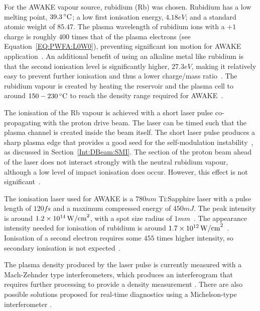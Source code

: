 For the AWAKE vapour source, rubidium (Rb) was chosen.
Rubidium has a low melting point, $39.3\celsius$; a low first ionisation energy, $4.18\unit{eV}$; and a standard atomic weight of $85.47$.
The plasma wavelength of rubidium ions with a $+1$ charge is roughly $400$ times that of the plasma electrons (see Equation~\ref{EQ:PWFA:L0W0}), preventing significant ion motion for AWAKE application~\cite{vieira:2012a}.
An additional benefit of using an alkaline metal like rubidium is that the second ionisation level is significantly higher, $27.3\unit{eV}$, making it relatively easy to prevent further ionisation and thus a lower charge/mass ratio~\cite{awake_collaboration:2017}.
The rubidium vapour is created by heating the reservoir and the plasma cell to around $150-230\celsius$ to reach the density range required for AWAKE~\cite{caldwell:2015,muggli:2017a}.

The ionisation of the Rb vapour is achieved with a short laser pulse co-propagating with the proton drive beam.
The laser can be timed such that the plasma channel is created inside the beam itself.
The short laser pulse produces a sharp plasma edge that provides a good seed for the self-modulation instability~\cite{vieira:2014a}, as discussed in Section~\ref{Int:DBeam:SMI}.
The section of the proton beam ahead of the laser does not interact strongly with the neutral rubidium vapour, although a low level of impact ionisation does occur.
However, this effect is not significant~\cite{awake_collaboration:2017}.

The ionisation laser used for AWAKE is a $780\unit{nm}$ Ti:Sapphire laser with a pulse length of $120\unit{fs}$ and a maximum compressed energy of $450\unit{mJ}$.
The peak intensity is around $1.2\nexp{14}\unit{W/cm}^{2}$, with a spot size radius of $1\unit{mm}$~\cite{awake_collaboration:2017}.
The appearance intensity needed for ionisation of rubidium is around $1.7\nexp{12}\unit{W/cm}^{2}$~\cite{augst:1989}.
Ionisation of a second electron requires some $455$ times higher intensity, so secondary ionisation is not expected~\cite{muggli:2017a}.

The plasma density produced by the laser pulse is currently measured with a Mach-Zehnder type interferometers, which produces an interferogram that requires further processing to provide a density measurement \cite{oz:2016}.
There are also possible solutions proposed for real-time diagnostics using a Michelson-type interferometer \cite{djotyan:2018}.

